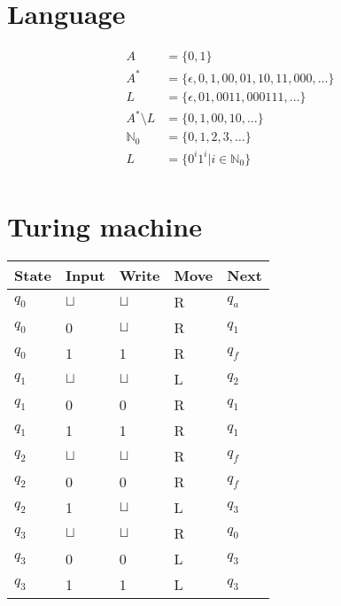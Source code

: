 \documentclass[a4paper, hidelinks, twocolumn, 9pt]{article}
\title{\topicname}
\author{}
\date{}
\newcommand{\blm}{\sqcup}
\newcommand{\bl}{\(\blm\)}
\begin{document}
  
  \maketitle
  \thispagestyle{fancy}

  \section*{Language}
  \begin{align*}
      A    &= \{ 0, 1 \} \\
      A^*  &= \{ \epsilon, 0, 1, 00, 01, 10, 11, 000, \ldots \} \\
      L    &= \{ \epsilon, 01, 0011, 000111, \ldots \} \\
      A^* \setminus L &= \{ 0, 1, 00, 10, \ldots \} \\[2mm]
    \mathbb{N}_0 &= \{ 0 , 1 , 2 , 3 , \ldots \} \\
      L &= \{ 0^i 1^i | i \in \mathbb{N}_0 \} \\
  \end{align*}
  
  \section*{Turing machine}
  \begin{center}
    \begin{tabular}{x{1cm}x{1cm}x{1cm}x{1cm}x{1cm}}
      \toprule
      State & Input & Write & Move & Next \\
      \midrule
      \(q_0\) & \bl & \bl & R & \(q_a\) \\
      \(q_0\) &   0 & \bl & R & \(q_1\) \\
      \(q_0\) &   1 &   1 & R & \(q_f\) \\
      \midrule
      \(q_1\) & \bl & \bl & L & \(q_2\) \\
      \(q_1\) &   0 &   0 & R & \(q_1\) \\
      \(q_1\) &   1 &   1 & R & \(q_1\) \\
      \midrule
      \(q_2\) & \bl & \bl & R & \(q_f\) \\
      \(q_2\) &   0 &   0 & R & \(q_f\) \\
      \(q_2\) &   1 & \bl & L & \(q_3\) \\
      \midrule
      \(q_3\) & \bl & \bl & R & \(q_0\) \\
      \(q_3\) &   0 &   0 & L & \(q_3\) \\
      \(q_3\) &   1 &   1 & L & \(q_3\) \\
      \bottomrule
    \end{tabular}
  \end{center}
\end{document}
